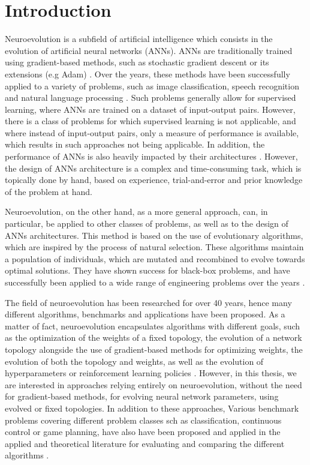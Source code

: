 \chapter{Introduction}

Neuroevolution is a subfield of artificial intelligence which consists in the evolution of artificial neural networks (ANNs).
ANNs are traditionally trained using gradient-based methods, such as stochastic gradient descent or its extensions (e.g Adam) \cite{sgd,adam}.
Over the years, these methods have been successfully applied to a variety of problems, such as image classification, speech recognition and natural language processing \cite{attention,cnn,speech}.
Such problems generally allow for supervised learning, where ANNs are trained on a dataset of input-output pairs.
However, there is a class of problems for which supervised learning is not applicable, and where instead of input-output pairs, only a measure of performance is available, which results
in such approaches not being applicable.
In addition, the performance of ANNs is also heavily impacted by their architectures \cite{layers}. However, the design of ANNs architecture is a complex and time-consuming task, which is
topically done by hand, based on experience, trial-and-error and prior knowledge of the problem at hand.

Neuroevolution, on the other hand, as a more general approach, can, in particular, be applied to other classes of problems, as well as to the design of ANNs architectures.
This method is based on the use of evolutionary algorithms, which are inspired by the process of natural selection. These algorithms maintain a population of individuals,
which are mutated and recombined to evolve towards optimal solutions. They have shown success for black-box problems, and have successfully been applied to a wide range
of engineering problems over the years \cite{openai_es,ea_applications}.

The field of neuroevolution has been researched for over 40 years, hence many different algorithms, benchmarks and applications have been proposed.
As a matter of fact, neuroevolution encapsulates algorithms with different goals, such as the optimization of the weights of a fixed topology, the evolution of a
network topology alongside the use of gradient-based methods for optimizing weights, the evolution of both the topology and weights, as well as the evolution
of hyperparameters or reinforcement learning policies \cite{neuroevolution_trends,neuroevolution_survey,nas_survey,neuroevolution_rl}.
However, in this thesis, we are interested in approaches relying entirely on neuroevolution, without the need for gradient-based methods, for evolving neural network
parameters, using evolved or fixed topologies. In addition to these approaches, Various benchmark problems covering different problem classes sch as classification,
continuous control or game planning, have also have been proposed and applied in the applied and theoretical literature for evaluating and comparing the different algorithms \cite{gym}.

